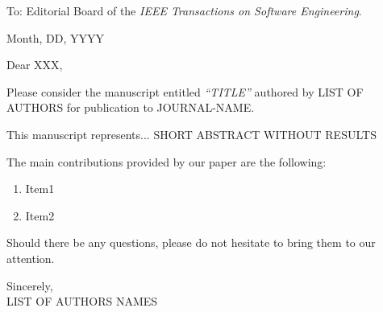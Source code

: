 \documentclass{letter}
\date{}
\begin{document}
\begin{letter}{To: Editorial Board of the \textit{IEEE Transactions on Software Engineering}}.

\hspace*{\fill}Month, DD, YYYY

\opening{Dear XXX,}

Please consider the manuscript entitled \textit{``TITLE''} authored by LIST OF AUTHORS for publication to JOURNAL-NAME. 

This manuscript represents... SHORT ABSTRACT WITHOUT RESULTS

The main contributions provided by our paper are the following: 

\begin{enumerate}
    \item Item1
    \item Item2
\end{enumerate}

Should there be any questions, please do not hesitate to bring them to our attention.

Sincerely, \\ LIST OF AUTHORS NAMES

\end{letter}
\end{document}
